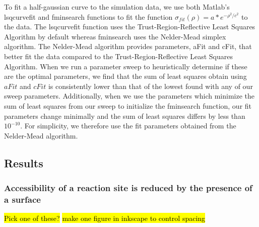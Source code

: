 \documentclass[../../AdvancementSummary.tex]{subfiles}
\begin{document}
To fit a half-gaussian curve to the simulation data, we use both Matlab's lsqcurvefit and fminsearch functions to fit the function $\sigma_{fit}(\rho) = a*e^{-\rho^2/c^2}$ to the data. The lsqcurvefit function uses the Trust-Region-Reflective Least Squares Algorithm by default whereas fminsearch uses the Nelder-Mead simplex algorithm.   The Nelder-Mead algorithm provides parameters, aFit and cFit, that better fit the data compared to the Trust-Region-Reflective Least Squares Algorithm. When we run a parameter sweep to heuristically determine if these are the optimal parameters, we find that the sum of least squares obtain using $aFit$ and $cFit$ is consistently lower than that of the lowest found with any of our sweep parameters.  Additionally, when we use the parameters which minimize the sum of least squares from our sweep to initialize the fminsearch function, our fit parameters change minimally and the sum of least squares differs by less than $10^{-10}$. For simplicity, we therefore use the fit parameters obtained from the Nelder-Mead algorithm.




\subsection{Results}

\subsubsection{Accessibility of a reaction site is reduced by the presence of a surface}


\hl{Pick one of these?}
\hl{make one figure in inkscape to control spacing}
\end{document}
